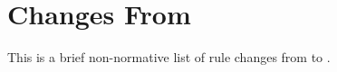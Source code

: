 \section{Changes From \LastRCYear}
This is a brief non-normative list of rule changes from \LastRCYear to \RCYear.

